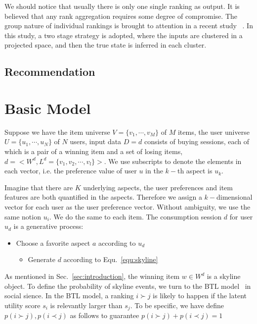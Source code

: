 \documentclass[sigconf]{acmart}
\begin{document}
We should notice that usually there is only one single ranking as output. It is believed that any rank aggregation requires some degree of compromise. The group nature of individual rankings is brought to attention in a recent study ~\cite{Wu2015Clustering}. In this study, a two stage strategy is adopted, where the inputs are clustered in a projected space, and then the true state is inferred in each cluster.



\subsection{Recommendation}



\section{Basic Model}\label{sec:model1}

Suppose we have the item universe $V=\{v_1,\cdots,v_M\}$ of $M$ items, the user universe $U=\{u_1,\cdots,u_N\}$ of $N$ users, input data $D={d}$ consists of buying sessions, each of which is a pair of a winning item and a set of losing items, $d=<W^d,L^d=\{v_1,v_2,\cdots,v_l\}>$. We use subscripts to denote the elements in each vector, i.e. the preference value of user $u$ in the $k-$th aspect is $u_k$. 

Imagine that there are $K$ underlying aspects, the user preferences and item features are both quantified in the aspects. Therefore we assign a $k-$dimensional vector for each user as the user preference vector. Without ambiguity, we use the same notion $u_i$. We do the same to each item. The consumption session $d$ for user $u_d$ is a generative process:


\begin{itemize}
	\item Choose a favorite aspect $a$ according to $u_d$
	
	\begin{itemize}
		\item Generate $d$ according to Equ.~\ref{equ:skyline}  
	\end{itemize}
\end{itemize}
  
As mentioned in Sec.~\ref{sec:introduction}, the winning item $w\in W^d$ is a skyline object. To define the probability of skyline events, we turn to the BTL model~\cite{Hunter2004MM} in social sience. In the BTL model, a ranking $i \succ j$ is likely to happen if the latent utility score $s_i$ is relevantly larger than $s_j$. To be specific, we have define $p(i \succ j), p(i \prec j)$ as follows to guarantee $p(i \succ j)+ p(i \prec j) =1$
\end{document}
